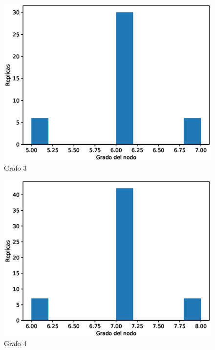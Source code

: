 \documentclass{article}
\begin{document}
\begin{figure}[H]
    \includegraphics[scale=0.6]{hist-grados-3}
    \caption{Grafo 3}
    \label{fig:matriz}
\end{figure}
\begin{figure}[H]
    \includegraphics[scale=0.6]{hist-grados-4}
    \caption{Grafo 4}
    \label{fig:matriz}
\end{figure}
\end{document}
